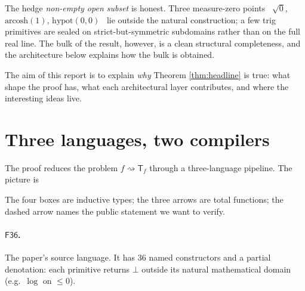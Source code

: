\documentclass[11pt]{article}
\newcommand{\F}{\mathsf{F36}}
\newcommand{\EL}{\mathsf{EL}}
\newcommand{\EML}{\mathsf{EML}}
\newcommand{\EMLC}{\mathsf{EML}_{\mathbb{C}}}
\theoremstyle{plain}
\theoremstyle{definition}
\begin{document}
The hedge \emph{non-empty open subset} is honest. Three measure-zero
points \textemdash\ $\sqrt{0}$, $\mathrm{arcosh}(1)$, $\mathrm{hypot}(0,0)$
\textemdash\ lie outside the natural construction; a few trig primitives
are sealed on strict-but-symmetric subdomains rather than on the full
real line. The bulk of the result, however, is a clean structural
completeness, and the architecture below explains how the bulk is
obtained.

The aim of this report is to explain \emph{why} Theorem
\ref{thm:headline} is true: what shape the proof has, what each
architectural layer contributes, and where the interesting ideas live.

\section{Three languages, two compilers}

The proof reduces the problem $f \rightsquigarrow \mathsf{T}_f$ through
a three-language pipeline. The picture is

\begin{center}
\end{center}

The four boxes are inductive types; the three arrows are total
functions; the dashed arrow names the public statement we want to
verify.

\paragraph{$\F$.} The paper's source language. It has $36$ named
constructors and a partial denotation: each primitive returns $\bot$
outside its natural mathematical domain (e.g.\ $\log$ on $\le 0$).
\end{document}
